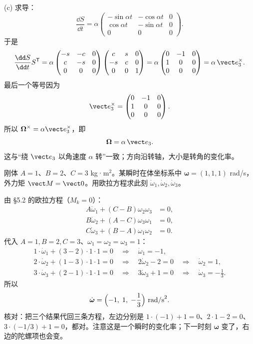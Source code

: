 \documentclass[11pt]{ctexart}
\begin{document}
(c) 求导：
\[
\frac{\dd S}{\dd t}=\alpha
\begin{pmatrix}
-\sin\alpha t&-\cos\alpha t&0\\
\cos\alpha t&-\sin\alpha t&0\\
0&0&0
\end{pmatrix}.
\]
于是
\[
\frac{\dd S}{\dd t}S^{\mathsf T}
=\alpha
\begin{pmatrix}
-s&-c&0\\ c&-s&0\\0&0&0
\end{pmatrix}
\begin{pmatrix}
c&s&0\\-s&c&0\\0&0&1
\end{pmatrix}
=\alpha
\begin{pmatrix}
0&-1&0\\1&0&0\\0&0&0
\end{pmatrix}
=\alpha\,\vect e_3^{\times}.
\]
最后一个等号因为
\[
\vect e_3^{\times}=
\begin{pmatrix}0&-1&0\\1&0&0\\0&0&0\end{pmatrix}.
\]
所以 $\boldsymbol\Omega^{\times}=\alpha\vect e_3^{\times}$，即
\[
\boldsymbol\Omega=\alpha\,\vect e_3 .
\]
这与“绕 $\vect e_3$ 以角速度 $\alpha$ 转”一致；方向沿转轴，大小是转角的变化率。

{刚体 $A=1$、$B=2$、$C=3$ kg·m$^2$。某瞬时在体坐标系中 $\boldsymbol\omega=(1,1,1)$ rad/s，外力矩 $\vect M=\vect0$。用欧拉方程求此刻 $\dot\omega_1,\dot\omega_2,\dot\omega_3$。}

由 §5.2 的欧拉方程（$M_k=0$）：
\[
\begin{aligned}
A\dot\omega_1+(C-B)\omega_2\omega_3&=0,\\
B\dot\omega_2+(A-C)\omega_3\omega_1&=0,\\
C\dot\omega_3+(B-A)\omega_1\omega_2&=0 .
\end{aligned}
\]
代入 $A=1,B=2,C=3$、$\omega_1=\omega_2=\omega_3=1$：
\begin{gather*}
1\cdot\dot\omega_1+(3-2)\cdot1\cdot1=0 \quad\Longrightarrow\quad \dot\omega_1=-1,\\
2\cdot\dot\omega_2+(1-3)\cdot1\cdot1=0 \quad\Longrightarrow\quad 2\dot\omega_2-2=0 \quad\Longrightarrow\quad \dot\omega_2=1,\\
3\cdot\dot\omega_3+(2-1)\cdot1\cdot1=0 \quad\Longrightarrow\quad 3\dot\omega_3+1=0 \quad\Longrightarrow\quad \dot\omega_3=-\frac13 .
\end{gather*}
所以
\[
\dot{\boldsymbol\omega}=\Bigl(-1,\;1,\;-\frac13\Bigr)\ \text{rad/s}^2 .
\]
核对：把三个结果代回三条方程，左边分别是 $1\cdot(-1)+1=0$、$2\cdot1-2=0$、$3\cdot(-1/3)+1=0$，都对。注意这是一个瞬时的变化率；下一时刻 $\boldsymbol\omega$ 变了，右边的陀螺项也会变。
\end{document}
